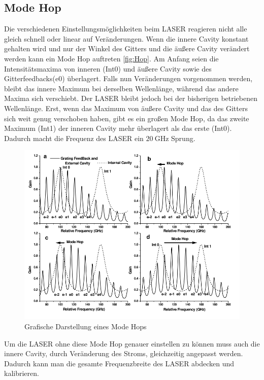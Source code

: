 \subsection{Mode Hop}
Die verschiedenen Einstellungsmöglichkeiten beim LASER reagieren nicht alle gleich schnell oder linear auf Veränderungen.
Wenn die innere Cavity konstant gehalten wird und nur der Winkel des Gitters und die äußere Cavity verändert werden kann ein Mode Hop auftreten \eqref{fig:Hop}.
Am Anfang seien die Intensitätsmaxima von inneren (Int0) und äußere Cavity sowie des Gitterfeedbacks(e0) überlagert. Falls nun Veränderungen vorgenommen werden, 
bleibt das innere Maximum bei derselben Wellenlänge, während das andere Maxima sich verschiebt. 
Der LASER bleibt jedoch bei der bisherigen betriebenen Wellenlänge. 
Erst, wenn das Maximum von äußere Cavity und das des Gitters sich weit genug verschoben haben, gibt es ein großen Mode Hop, 
da das zweite Maximum (Int1) der inneren Cavity mehr überlagert als das erste (Int0).
Dadurch macht die Frequenz des LASER ein $\qty{20}{\giga\hertz}$ Sprung. 

\begin{figure}[H]
    \centering
    \includegraphics[width=\textwidth]{Bilder/Mode_Hop.png} 
    \caption{Grafische Darstellung eines Mode Hops \cite{bk:LASER}}
    \label{fig:Hop}
\end{figure}

Um die LASER ohne diese Mode Hop genauer einstellen zu können muss auch die innere Cavity, durch Veränderung des Stroms, gleichzeitig angepasst werden.
Dadurch kann man die gesamte Frequenzbreite des LASER abdecken und kalibrieren. 


